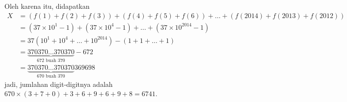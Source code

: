 \documentclass[12pt]{scrartcl}
\begin{document}
\begin{enumerate}[resume]
\begin{solusi}
        Oleh karena itu, didapatkan 
        \begin{align*}
        X &= (f(1)+f(2)+f(3))+(f(4)+f(5)+f(6))+\dots+(f(2014)+f(2013)+f(2012)) \\
        &= (37 \times 10^1 -1)+(37 \times 10^4 -1)+ \dots + (37 \times 10^{2014}-1)\\
        &= 37(10^1+10^4+\dots+10^{2014})-(1+1+\dots+1)\\
        &= \underbrace{370370\dots 370370}_{672 \text{ buah } 370} - 672\\
        &= \underbrace{370370\dots 370370}_{670 \text{ buah } 370}369698
        \end{align*}
        jadi, jumlahan digit-digitnya adalah $670 \times (3+7+0)+3+6+9+6+9+8=6741$.
    \end{solusi}
	
\end{enumerate}

\newpage
\end{document}
